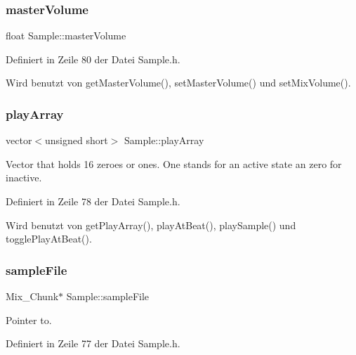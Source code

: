 \subsubsection{\texorpdfstring{master\+Volume}{masterVolume}}
{\footnotesize\ttfamily float Sample\+::master\+Volume\hspace{0.3cm}{\ttfamily [private]}}



Definiert in Zeile 80 der Datei Sample.\+h.



Wird benutzt von get\+Master\+Volume(), set\+Master\+Volume() und set\+Mix\+Volume().

\mbox{\label{class_sample_a824014df7294cb94445e7ee89cc15987}} 
\subsubsection{\texorpdfstring{play\+Array}{playArray}}
{\footnotesize\ttfamily vector$<$unsigned short$>$ Sample\+::play\+Array\hspace{0.3cm}{\ttfamily [private]}}



Vector that holds 16 zeroes or ones. One stands for an active state an zero for inactive. 



Definiert in Zeile 78 der Datei Sample.\+h.



Wird benutzt von get\+Play\+Array(), play\+At\+Beat(), play\+Sample() und toggle\+Play\+At\+Beat().

\mbox{\label{class_sample_ae158342c8d18a05de1c85802f7cfbd2a}} 
\subsubsection{\texorpdfstring{sample\+File}{sampleFile}}
{\footnotesize\ttfamily Mix\+\_\+\+Chunk$\ast$ Sample\+::sample\+File\hspace{0.3cm}{\ttfamily [private]}}



Pointer to. 



Definiert in Zeile 77 der Datei Sample.\+h.



